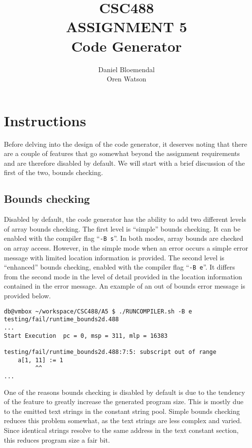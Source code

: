 \documentclass[oneside]{amsart}
\theoremstyle{definition}
\theoremstyle{remark}
\numberwithin{equation}{section}
\begin{document}
\title[CSC488 A5]{CSC488\\ASSIGNMENT 5\\Code Generator}
\author{Daniel Bloemendal \\ Oren Watson}

\begin{titlepage}
\maketitle
\thispagestyle{empty}
\tableofcontents
\end{titlepage}

\section{Instructions}
Before delving into the design of the code generator, it deserves noting that there are a couple of
features that go somewhat beyond the assignment requirements and are therefore disabled by default.
We will start with a brief discussion of the first of the two, bounds checking.

\subsection{Bounds checking}
Disabled by default, the code generator has the ability to add two different levels of array bounds
checking. The first level is ``simple'' bounds checking. It can be enabled with the compiler flag
``\texttt{-B s}''. In both modes, array bounds are checked on array access. However, in the simple
mode when an error occurs a simple error message with limited location information is provided. The
second level is ``enhanced'' bounds checking, enabled with the compiler flag ``\texttt{-B e}''. It
differs from the second mode in the level of detail provided in the location information contained
in the error message. An example of an out of bounds error message is provided below.
\begin{lstlisting}[caption=Out of bounds error, basicstyle=\fontsize{7}{10}\selectfont\ttfamily]
db@vmbox ~/workspace/CSC488/A5 $ ./RUNCOMPILER.sh -B e testing/fail/runtime_bounds2d.488
...
Start Execution  pc = 0, msp = 311, mlp = 16383

testing/fail/runtime_bounds2d.488:7:5: subscript out of range
    a[1, 11] := 1
         ^^
...
\end{lstlisting}
One of the reasons bounds checking is disabled by default is due to the tendency of the feature to
greatly increase the generated program size. This is mostly due to the emitted text strings in the
constant string pool. Simple bounds checking reduces this problem somewhat, as the text strings are
less complex and varied. Since identical strings resolve to the same address in the text constant
section, this reduces program size a fair bit.
\end{document}

